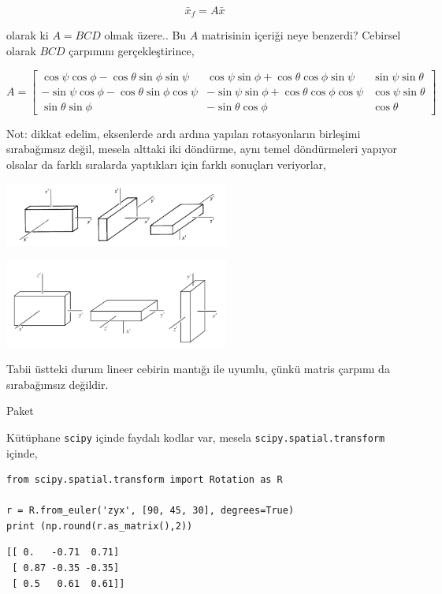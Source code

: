 \documentclass[12pt,fleqn]{article}\usepackage{../../common}
\begin{document}
$$
\bar{x}_f =  A \bar{x}
$$

olarak ki $A = BCD$ olmak üzere.. Bu $A$ matrisinin içeriği neye benzerdi? Cebirsel
olarak $BCD$ çarpımını gerçekleştirince,

$$
A = \left[\begin{array}{ccc}
\cos\psi\cos\phi-\cos\theta\sin\phi\sin\psi &
\cos\psi\sin\phi + \cos\theta\cos\phi\sin\psi &
\sin\psi\sin\theta \\
-\sin\psi\cos\phi-\cos\theta\sin\phi\cos\psi &
-\sin\psi\sin\phi + \cos\theta\cos\phi\cos\psi &
\cos\psi\sin\theta \\
\sin\theta \sin\phi &
-\sin\theta\cos\phi &
\cos\theta
\end{array}\right]
$$

Not: dikkat edelim, eksenlerde ardı ardına yapılan rotasyonların birleşimi
sırabağımsız değil, mesela alttaki iki döndürme, aynı temel döndürmeleri
yapıyor olsalar da farklı sıralarda yaptıkları için farklı sonuçları veriyorlar,

\includegraphics[width=20em]{phy_072_rot_01.png}

\includegraphics[width=20em]{phy_072_rot_02.png}

Tabii üstteki durum lineer cebirin mantığı ile uyumlu, çünkü matris çarpımı da
sırabağımsız değildir.

Paket

Kütüphane \verb!scipy! içinde faydalı kodlar var, mesela \verb!scipy.spatial.transform!
içinde,

\begin{verbatim}
from scipy.spatial.transform import Rotation as R

r = R.from_euler('zyx', [90, 45, 30], degrees=True)
print (np.round(r.as_matrix(),2))
\end{verbatim}

\begin{verbatim}
[[ 0.   -0.71  0.71]
 [ 0.87 -0.35 -0.35]
 [ 0.5   0.61  0.61]]
\end{verbatim}
\end{document}
